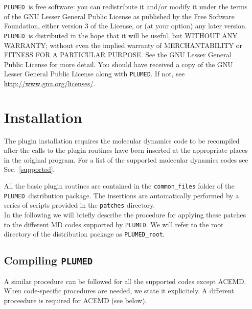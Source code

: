 \documentclass[12pt,fleqn]{report}
\newcommand{\plumed}{{\tt PLUMED}}
\begin{document}
\plumed \ is free software: you can redistribute it and/or modify 
it under the terms of the GNU Lesser General Public License as published by 
the Free Software Foundation, either version 3 of the License, or 
(at your option) any later version. 
\plumed \ is distributed in the hope that it will be useful,
but WITHOUT ANY WARRANTY; without even the implied warranty of
MERCHANTABILITY or FITNESS FOR A PARTICULAR PURPOSE.  See the 
GNU Lesser General Public License for more detail. 
You should have received a copy of the GNU Lesser General Public License
along with {\tt PLUMED}.  If not, see  \url{http://www.gnu.org/licenses/}.


\chapter{Installation}
\label{sec.install}
The plugin  installation requires the molecular
dynamics code to be recompiled after the calls to the plugin routines 
have been inserted at the appropriate places in the original program.  
For a list of the supported molecular dynamics codes see Sec.~\ref{supported}.

All the basic plugin routines are contained in the {\tt common\_files} folder of
the \plumed \ distribution package.
The insertions are automatically performed by a series of
scripts provided in the {\tt patches} directory.
\\
In the following we will briefly describe the procedure for applying these patches
to the different MD codes supported by \plumed.
We will refer to the root directory of the distribution package as {\tt PLUMED\_root}.

\section{Compiling \plumed}

A similar procedure can be followed for all the supported codes except ACEMD.
When code-specific procedures are needed, we state it explicitely.
A different proceedure is required for ACEMD (see below).
\end{document}
